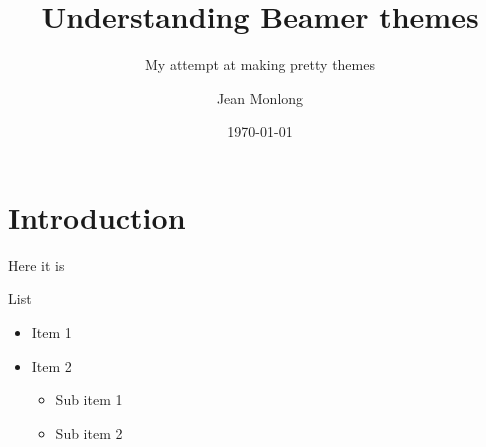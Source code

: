 \documentclass{beamer}
\title{Understanding Beamer themes}
\subtitle{My attempt at making pretty themes}
\author{Jean Monlong}
\date{\today}
\begin{document}
\begin{frame}
  \titlepage
\end{frame}

\section{Introduction}

\begin{frame}{Here it is}
  \begin{block}{List}
    \begin{itemize}
    \item Item 1
    \item Item 2
      \begin{itemize}
      \item Sub item 1
      \item Sub item 2
      \end{itemize}
    \end{itemize}
  \end{block}
  
\end{frame}
\end{document}

